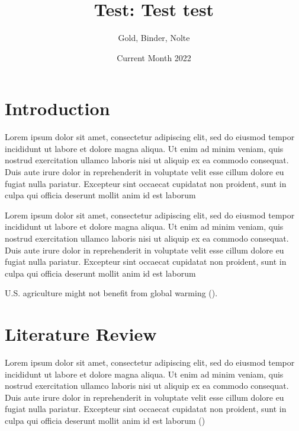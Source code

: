 \documentclass{article}
\title{Test: Test test}
\author{Gold, Binder, Nolte}
\date{Current Month 2022}
\begin{document}
\maketitle

\section{Introduction}

\par Lorem ipsum dolor sit amet, consectetur adipiscing elit, sed do eiusmod tempor incididunt ut labore et dolore magna aliqua. Ut enim ad minim veniam, quis nostrud exercitation ullamco laboris nisi ut aliquip ex ea commodo consequat. Duis aute irure dolor in reprehenderit in voluptate velit esse cillum dolore eu fugiat nulla pariatur. Excepteur sint occaecat cupidatat non proident, sunt in culpa qui officia deserunt mollit anim id est laborum 

\par Lorem ipsum dolor sit amet, consectetur adipiscing elit, sed do eiusmod tempor incididunt ut labore et dolore magna aliqua. Ut enim ad minim veniam, quis nostrud exercitation ullamco laboris nisi ut aliquip ex ea commodo consequat. Duis aute irure dolor in reprehenderit in voluptate velit esse cillum dolore eu fugiat nulla pariatur. Excepteur sint occaecat cupidatat non proident, sunt in culpa qui officia deserunt mollit anim id est laborum
\par U.S. agriculture might not benefit from global warming (\cite{Schlenker2005}).

\section{Literature Review}

\par Lorem ipsum dolor sit amet, consectetur adipiscing elit, sed do eiusmod tempor incididunt ut labore et dolore magna aliqua. Ut enim ad minim veniam, quis nostrud exercitation ullamco laboris nisi ut aliquip ex ea commodo consequat. Duis aute irure dolor in reprehenderit in voluptate velit esse cillum dolore eu fugiat nulla pariatur. Excepteur sint occaecat cupidatat non proident, sunt in culpa qui officia deserunt mollit anim id est laborum (\cite{Schlenker2005})

\medskip

\printbibliography
\end{document}
